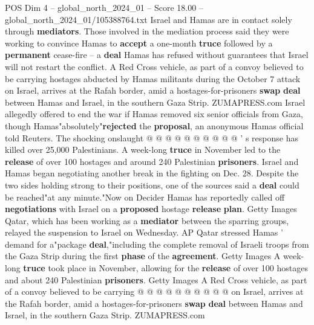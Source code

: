 \begin{textsample}{POS Dim 4 – global\_north\_2024\_01 – Score 18.00 – global\_north\_2024\_01/105388764.txt}
Israel and Hamas are in contact solely through \textbf{mediators}.
Those involved in the mediation process said they were working to convince Hamas to \textbf{accept} a one-month \textbf{truce} followed by a \textbf{permanent} cease-fire -- a \textbf{deal} Hamas has refused without guarantees that Israel will not restart the conflict.
A Red Cross vehicle, as part of a convoy believed to be carrying hostages abducted by Hamas militants during the October 7 attack on Israel, arrives at the Rafah border, amid a hostages-for-prisoners \textbf{swap} \textbf{deal} between Hamas and Israel, in the southern Gaza Strip.
ZUMAPRESS.com Israel allegedly offered to end the war if Hamas removed six senior officials from Gaza, though Hamas"absolutely"\textbf{rejected} the \textbf{proposal}, an anonymous Hamas official told Reuters.
The shocking onslaught @ @ @ @ @ @ @ @ @ @ ' s response has killed over 25,000 Palestinians.
A week-long \textbf{truce} in November led to the \textbf{release} of over 100 hostages and around 240 Palestinian \textbf{prisoners}.
Israel and Hamas began negotiating another break in the fighting on Dec. 28.
Despite the two sides holding strong to their positions, one of the sources said a \textbf{deal} could be reached"at any minute."Now on Decider Hamas has reportedly called off \textbf{negotiations} with Israel on a \textbf{proposed} hostage \textbf{release} \textbf{plan}.
Getty Images Qatar, which has been working as a \textbf{mediator} between the sparring groups, relayed the suspension to Israel on Wednesday.
AP Qatar stressed Hamas ' demand for a"package \textbf{deal},"including the complete removal of Israeli troops from the Gaza Strip during the first \textbf{phase} of the \textbf{agreement}.
Getty Images A week-long \textbf{truce} took place in November, allowing for the \textbf{release} of over 100 hostages and about 240 Palestinian \textbf{prisoners}.
Getty Images A Red Cross vehicle, as part of a convoy believed to be carrying @ @ @ @ @ @ @ @ @ @ on Israel, arrives at the Rafah border, amid a hostages-for-prisoners \textbf{swap} \textbf{deal} between Hamas and Israel, in the southern Gaza Strip.
ZUMAPRESS.com

\end{textsample}
